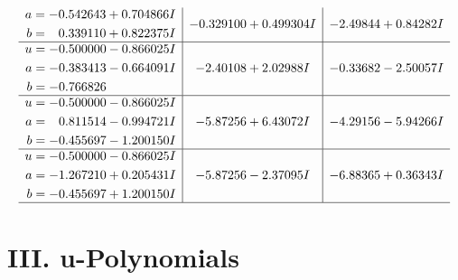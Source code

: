 \documentclass[1p]{elsarticle_modified}
\theoremstyle{definition}
\begin{document}
$$\begin{array}{c|c|c}
\begin{aligned}
a &= -0.542643 + 0.704866 I \\
b &= \phantom{-}0.339110 + 0.822375 I\end{aligned}
 & -0.329100 + 0.499304 I & -2.49844 + 0.84282 I \\ \hline\begin{aligned}
u &= -0.500000 - 0.866025 I \\
a &= -0.383413 - 0.664091 I \\
b &= -0.766826\phantom{ +0.000000I}\end{aligned}
 & -2.40108 + 2.02988 I & -0.33682 - 2.50057 I \\ \hline\begin{aligned}
u &= -0.500000 - 0.866025 I \\
a &= \phantom{-}0.811514 - 0.994721 I \\
b &= -0.455697 - 1.200150 I\end{aligned}
 & -5.87256 + 6.43072 I & -4.29156 - 5.94266 I \\ \hline\begin{aligned}
u &= -0.500000 - 0.866025 I \\
a &= -1.267210 + 0.205431 I \\
b &= -0.455697 + 1.200150 I\end{aligned}
 & -5.87256 - 2.37095 I & -6.88365 + 0.36343 I\\
 \hline 
 \end{array}$$\newpage
\newpage\renewcommand{\arraystretch}{1}
\centering \section*{ III. u-Polynomials}
\end{document}
